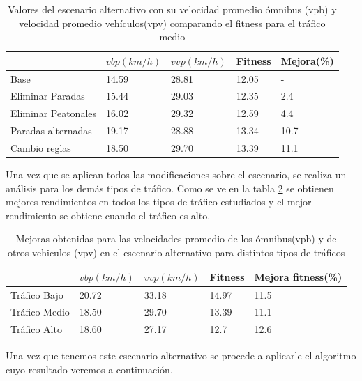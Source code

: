 \begin{table}[H]
	\renewcommand{\arraystretch}{1.2}
	\caption{Valores del escenario alternativo con su velocidad promedio ómnibus (vpb) y velocidad promedio vehículos(vpv) comparando el fitness para el tráfico medio }
	\label{table:resultado_alternativo}
	\centering
	\begin{tabular}{p{3.5cm}p{2.5cm}p{2.5cm}p{2cm}p{2cm} }
		\hline
		&
		$vbp(km/h)$& 
		$vvp(km/h)$ & 
		Fitness &
		Mejora(\%)
		\\ 
		\hline
		Base & 14.59  & 28.81& 12.05 & -\\
		Eliminar Paradas & 15.44  & 29.03& 12.35 & 2.4\\
		Eliminar Peatonales  & 16.02  & 29.32& 12.59 & 4.4\\
		Paradas alternadas  & 19.17  & 28.88& 13.34 & 10.7\\	
		Cambio reglas  & 18.50  & 29.70& 13.39 & 11.1\\				
		\hline
	\end{tabular}
\end{table}

Una vez que se aplican todos las modificaciones sobre el escenario, se realiza un análisis para los demás tipos de tráfico. Como se ve en la tabla \ref{table:mejoras_trafico_alternativo} se obtienen mejores rendimientos en todos los tipos de tráfico estudiados y el mejor rendimiento se obtiene cuando el tráfico es alto. 

\begin{table}[H]
	\renewcommand{\arraystretch}{1.2}
	\caption{Mejoras obtenidas para las velocidades promedio de los ómnibus(vpb) y de otros vehiculos (vpv) en el escenario alternativo para distintos tipos de tráficos }
	\label{table:mejoras_trafico_alternativo}
	\centering
	\begin{tabular}{p{3.5cm}p{2.5cm}p{2.5cm}p{2cm}p{2cm} }
		\hline
		&
		$vbp(km/h)$& 
		$vvp(km/h)$ & 
		Fitness &
		Mejora fitness(\%)
		\\ 
		\hline

		Tráfico Bajo & 20.72  & 33.18 & 14.97 & 11.5\\
		Tráfico Medio & 18.50  & 29.70& 13.39 & 11.1 \\
		Tráfico Alto  & 18.60  & 27.17& 12.7 & 12.6\\		
		\hline
	\end{tabular}
\end{table}

Una vez que tenemos este escenario alternativo se procede a aplicarle el algoritmo cuyo resultado veremos a continuación.


